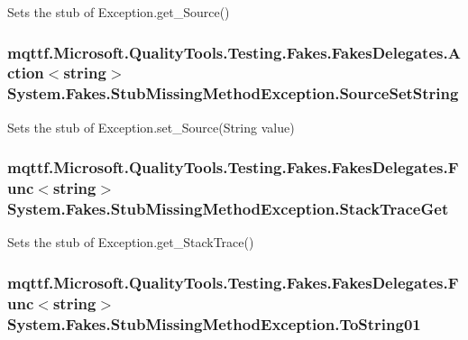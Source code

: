 Sets the stub of Exception.\-get\-\_\-\-Source()

\hypertarget{class_system_1_1_fakes_1_1_stub_missing_method_exception_a782a6cbe3e83e361a116d4f0d1d546bc}{
\subsubsection[{Source\-Set\-String}]{\setlength{\rightskip}{0pt plus 5cm}mqttf.\-Microsoft.\-Quality\-Tools.\-Testing.\-Fakes.\-Fakes\-Delegates.\-Action$<$string$>$ System.\-Fakes.\-Stub\-Missing\-Method\-Exception.\-Source\-Set\-String}}\label{class_system_1_1_fakes_1_1_stub_missing_method_exception_a782a6cbe3e83e361a116d4f0d1d546bc}


Sets the stub of Exception.\-set\-\_\-\-Source(\-String value)

\hypertarget{class_system_1_1_fakes_1_1_stub_missing_method_exception_afeec03052788d3d9a9222d9a19785103}{
\subsubsection[{Stack\-Trace\-Get}]{\setlength{\rightskip}{0pt plus 5cm}mqttf.\-Microsoft.\-Quality\-Tools.\-Testing.\-Fakes.\-Fakes\-Delegates.\-Func$<$string$>$ System.\-Fakes.\-Stub\-Missing\-Method\-Exception.\-Stack\-Trace\-Get}}\label{class_system_1_1_fakes_1_1_stub_missing_method_exception_afeec03052788d3d9a9222d9a19785103}


Sets the stub of Exception.\-get\-\_\-\-Stack\-Trace()

\hypertarget{class_system_1_1_fakes_1_1_stub_missing_method_exception_a6ce324d5c5bec02f0f6ba47343868346}{
\subsubsection[{To\-String01}]{\setlength{\rightskip}{0pt plus 5cm}mqttf.\-Microsoft.\-Quality\-Tools.\-Testing.\-Fakes.\-Fakes\-Delegates.\-Func$<$string$>$ System.\-Fakes.\-Stub\-Missing\-Method\-Exception.\-To\-String01}}\label{class_system_1_1_fakes_1_1_stub_missing_method_exception_a6ce324d5c5bec02f0f6ba47343868346}


